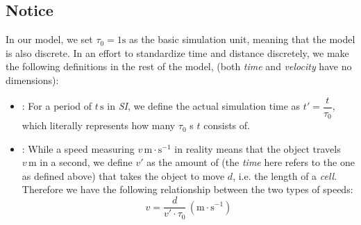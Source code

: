 \documentclass{article}
\theoremstyle{definition}
\theoremstyle{remark}
\numberwithin{equation}{section}
\begin{document}
	\subsection{Notice}
	In our model, we set \(\tau_0=1\mathrm{s}\) as the basic simulation unit, meaning that the model is also discrete. In an effort to standardize time and distance discretely, we make the following definitions in the rest of the model, (both \textit{time} and \textit{velocity} have no dimensions):
	\begin{itemize}
		\item {}:
			For a period of \(t\,\mathrm{s}\) in \textit{SI}, we define the actual simulation time as \(t'=\dfrac{t}{\tau_0}\), which literally represents how many \(\tau_0\) s \(t\) consists of.
		\item {}:
			While a speed measuring \(v\,\mathrm{m\cdot s^{-1}}\) in reality means that the object travels \(v\,\mathrm{m}\) in a second, we define  \(v'\) as the amount of  (the \textit{time} here refers to the one as defined above) that takes the object to move \(d\), i.e. the length of a \textit{cell}. Therefore we have the following relationship between the two types of speeds:\[v=\dfrac{d}{v'\cdot \tau_0}\,\left(\mathrm{m\cdot s^{-1}}\right)\]
	\end{itemize}
\end{document}
